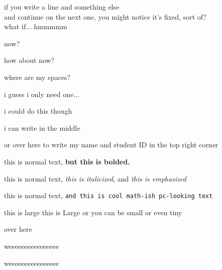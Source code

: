 \documentclass[11pt, oneside]{article}   	%
\begin{document}
if you write a line and something else \\
and continue on the next one, you might notice it's fixed, sort of? \\
what if...
hmmmmm

now?








how about now?











where are my spaces?

i guess i only need one...


\vspace{60pt} 

i could do this though

\begin{center}
i can write in the middle
\end{center}

\begin{flushright}
or over here to write my name and student ID in the top right corner
\end{flushright}

this is normal text, \textbf{but this is bolded.}

this is normal text, \textit{this is italicized}, and \emph{this is emphasized}


\vspace{36pt}

this is normal text, \texttt{and this is cool math-ish pc-looking text}

{\large this is large} 
{\Large this is Large}
{\small or you can be small}
{\tiny or even tiny}

\vspace{1in}


\hspace{200pt} over here


\hspace{2in} weeeeeeeeeeeeeeee

\hspace{7in} weeeeeeeeeeeeeeee
\end{document}
